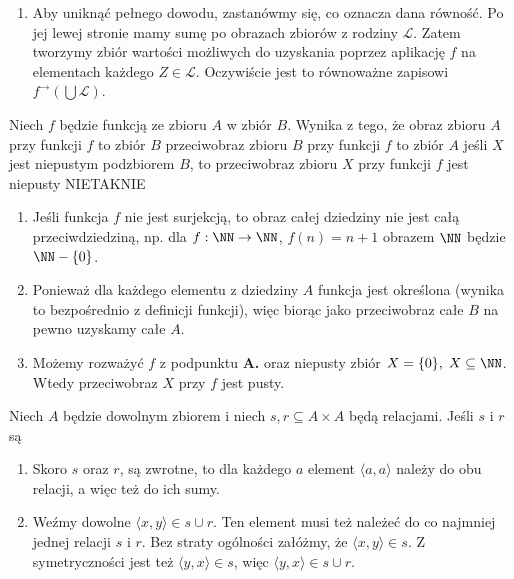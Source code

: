 \begin{solutions}
\begin{enumerate}[\bf A.]
        \item Aby uniknąć pełnego dowodu, zastanówmy się, co oznacza dana równość. Po jej lewej stronie mamy sumę po obrazach zbiorów z rodziny $\mathcal{L}$. Zatem tworzymy zbiór wartości możliwych do uzyskania poprzez aplikację $f$ na elementach każdego $Z \in \mathcal{L}$. Oczywiście jest to równoważne zapisowi $f^{\rightarrow} (\bigcup \mathcal{L})$.
    \end{enumerate}

    \sol Niech $f$ będzie funkcją ze zbioru $A$ w zbiór $B$. Wynika z tego, że
    \answerss
    {obraz zbioru $A$ przy funkcji $f$ to zbiór $B$}
    {przeciwobraz zbioru $B$ przy funkcji $f$ to zbiór $A$}
    {jeśli $X$ jest niepustym podzbiorem $B$, to przeciwobraz zbioru $X$ przy funkcji $f$ jest niepusty}
    {NIE}{TAK}{NIE}

    \begin{enumerate}[\bf A.]
        \item Jeśli funkcja $f$ nie jest surjekcją, to obraz całej dziedziny nie jest całą przeciwdziedziną, np. dla $f: \NN \to \NN$, $f(n) = n + 1$ obrazem $\NN$ będzie $\NN - \{0\}$.

        \item Ponieważ dla każdego elementu z dziedziny $A$ funkcja jest określona (wynika to bezpośrednio z definicji funkcji), więc biorąc jako przeciwobraz całe $B$ na pewno uzyskamy całe $A$.

        \item Możemy rozważyć $f$ z podpunktu \textbf{A.} oraz niepusty zbiór $X = \{0\}, \; X \subseteq \NN$. Wtedy przeciwobraz $X$ przy $f$ jest pusty.
    \end{enumerate}

    \sol Niech $A$ będzie dowolnym zbiorem i niech $s,r\subseteq A\times A$ będą relacjami. Jeśli $s$ i $r$ są

    \begin{enumerate}[\bf A.]
        \item Skoro $s$ oraz $r$, są zwrotne, to dla każdego $a$ element $\langle a, a \rangle$ należy do obu relacji, a więc też do ich sumy.

        \item Weźmy dowolne $\langle x, y \rangle \in s \cup r$. Ten element musi też należeć do co najmniej jednej relacji $s$ i $r$. Bez straty ogólności załóżmy, że $\langle x, y \rangle \in s$. Z symetryczności jest też $\langle y, x \rangle \in s$, więc $\langle y, x \rangle \in s \cup r$.


\end{enumerate}
\end{solutions}
